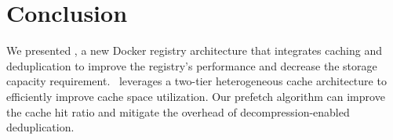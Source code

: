 \section{Conclusion}
\label{sec:conclusion}
We presented \sysname, a new Docker registry architecture that integrates caching and deduplication  
to
improve the registry's performance and decrease the storage capacity requirement. 
\sysname~leverages a two-tier heterogeneous cache architecture to efficiently improve cache space 
utilization. Our prefetch algorithm can improve the cache hit ratio and mitigate the overhead of decompression-enabled deduplication.
